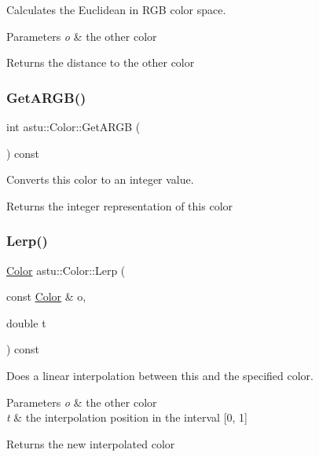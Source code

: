 Calculates the Euclidean in R\+GB color space.


\begin{DoxyParams}{Parameters}
{\em o} & the other color \\
\hline
\end{DoxyParams}
\begin{DoxyReturn}{Returns}
the distance to the other color 
\end{DoxyReturn}
\mbox{\label{classastu_1_1Color_a6e8ee28f89245f4e8d96c8c62144854f}} 
\subsubsection{\texorpdfstring{Get\+A\+R\+G\+B()}{GetARGB()}}
{\footnotesize\ttfamily int astu\+::\+Color\+::\+Get\+A\+R\+GB (\begin{DoxyParamCaption}{ }\end{DoxyParamCaption}) const}

Converts this color to an integer value.

\begin{DoxyReturn}{Returns}
the integer representation of this color 
\end{DoxyReturn}
\mbox{\label{classastu_1_1Color_a0dc0303a14adf0712e12e756bde1b365}} 
\subsubsection{\texorpdfstring{Lerp()}{Lerp()}}
{\footnotesize\ttfamily \hyperlink{classastu_1_1Color}{Color} astu\+::\+Color\+::\+Lerp (\begin{DoxyParamCaption}\item[{const \hyperlink{classastu_1_1Color}{Color} \&}]{o,  }\item[{double}]{t }\end{DoxyParamCaption}) const}

Does a linear interpolation between this and the specified color.


\begin{DoxyParams}{Parameters}
{\em o} & the other color \\
\hline
{\em t} & the interpolation position in the interval \mbox{[}0, 1\mbox{]} \\
\hline
\end{DoxyParams}
\begin{DoxyReturn}{Returns}
the new interpolated color 
\end{DoxyReturn}
\mbox{\label{classastu_1_1Color_ad55ea16978ae52e3feb77109865921bd}} 
